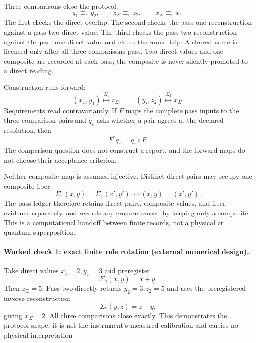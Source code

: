 Three comparisons close the protocol:
\[
 y_1\equiv_\varepsilon y_2,\qquad
 z_\Sigma\equiv_\varepsilon z_2,\qquad
 x_\Sigma\equiv_\varepsilon x_1.
\]
The first checks the direct overlap.  The second checks the pass-one reconstruction against a pass-two direct value.
The third checks the pass-two reconstruction against the pass-one direct value and closes the round trip.  A shared
name is licensed only after all three comparisons pass.  Two direct values and one composite are recorded at each pass;
the composite is never silently promoted to a direct reading.

Construction runs forward:
\[
 (x_1,y_1)\mathrel{\overset{\Sigma_1}{\longmapsto}}z_\Sigma,\qquad
 (y_2,z_2)\mathrel{\overset{\Sigma_2}{\longmapsto}}x_\Sigma.
\]
Requirements read contravariantly.  If \(F\) maps the complete pass inputs to the three comparison pairs and
\(q_\varepsilon\) asks whether a pair agrees at the declared resolution, then
\[
                         F^*q_\varepsilon=q_\varepsilon\circ F.
\]
The comparison question does not construct a report, and the forward maps do not choose their acceptance criterion.

Neither composite map is assumed injective.  Distinct direct pairs may occupy one composite fiber:
\[
 \Sigma_1(x,y)=\Sigma_1(x',y')\not\Rightarrow(x,y)=(x',y').
\]
The pass ledger therefore retains direct pairs, composite values, and fiber evidence separately, and records any
erasure caused by keeping only a composite.  This is a computational handoff between finite records, not a physical or
quantum superposition.

\paragraph{Worked check 1: exact finite role rotation (external numerical design).}
Take direct values \(x_1=2,y_1=3\) and preregister
\[
                         \Sigma_1(x,y)=x+y.
\]
Then \(z_\Sigma=5\).  Pass two directly returns \(y_2=3,z_2=5\) and uses the preregistered inverse reconstruction
\[
                         \Sigma_2(y,z)=z-y,
\]
giving \(x_\Sigma=2\).  All three comparisons close exactly.  This demonstrates the protocol shape; it is not the
instrument's measured calibration and carries no physical interpretation.

